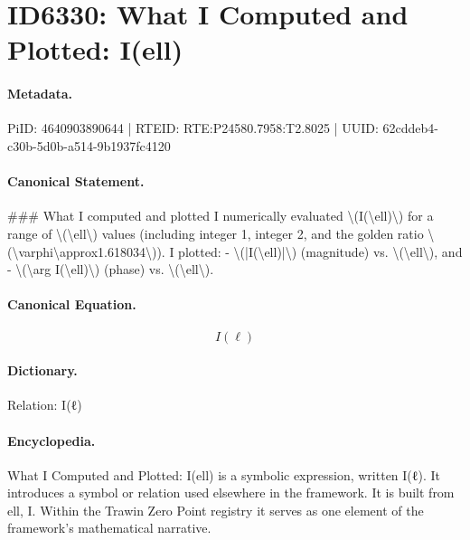 \section*{ID6330: What I Computed and Plotted: I(ell)}
\paragraph{Metadata.}
PiID: 4640903890644 | RTEID: RTE:P24580.7958:T2.8025 | UUID: 62cddeb4-c30b-5d0b-a514-9b1937fc4120

\paragraph{Canonical Statement.}
\#\#\# What I computed and plotted I numerically evaluated \textbackslash{}(I(\textbackslash{}ell)\textbackslash{}) for a range of \textbackslash{}(\textbackslash{}ell\textbackslash{}) values (including integer 1, integer 2, and the golden ratio \textbackslash{}(\textbackslash{}varphi\textbackslash{}approx1.618034\textbackslash{})). I plotted: - \textbackslash{}(|I(\textbackslash{}ell)|\textbackslash{}) (magnitude) vs. \textbackslash{}(\textbackslash{}ell\textbackslash{}), and - \textbackslash{}(\textbackslash{}arg I(\textbackslash{}ell)\textbackslash{}) (phase) vs. \textbackslash{}(\textbackslash{}ell\textbackslash{}).

\paragraph{Canonical Equation.}
\[
I(\ell)
\]

\paragraph{Dictionary.}
Relation: I(ℓ)

\paragraph{Encyclopedia.}
What I Computed and Plotted: I(ell) is a symbolic expression, written I(ℓ). It introduces a symbol or relation used elsewhere in the framework. It is built from ell, I. Within the Trawin Zero Point registry it serves as one element of the framework's mathematical narrative.
